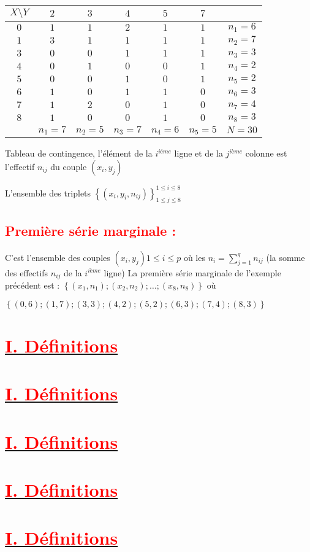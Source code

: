 \documentclass[12pt]{article}
\begin{document}
\begin{table}[h]
\begin{tabular}{|c|c|c|c|c|c|c|}
\hline
$X\setminus Y$  & $2$ & $3$ & $4$ & $5$ & $7$ &  \\
\hline
$0$ & $1$ & $1$ & $2$ & $1$ & $1$ & $n_{1}=6$ \\
\hline
$1$  & $3$ & $1$ & $1$ & $1$ & $1$ & $n_{2}=7$ \\
\hline
$3$ & $0$ & $0$ & $1$ & $1$ & $1$ & $n_{3}=3$ \\
\hline
$4$  & $0$ & $1$ & $0$ & $0$ & $1$ & $n_{4}=2$ \\
\hline
$5$ & $0$ & $0$ & $1$ & $0$ & $1$ & $n_{5}=2$ \\
\hline
$6$  & $1$ & $0$ & $1$ & $1$ & $0$ & $n_{6}=3$ \\
\hline
$7$ & $1$ & $2$ & $0$ & $1$ & $0$ & $n_{7}=4$ \\
\hline
$8$  & $1$ & $0$ & $0$ & $1$ & $0$ & $n_{8}=3$ \\
\hline
  & $n_{1}=7$ & $n_{2}=5$ & $n_{3}=7$ & $n_{4}=6$ & $n_{5}=5$ & $N=30$ \\
\hline
\end{tabular}
\end{table}

Tableau de contingence, l’élément de la $i^{iéme}$ ligne et de la $j^{ième}$ colonne est l’effectif $n_{ij}$ du couple $(x_{i},y_{j})$

L’ensemble des triplets 
$\left\lbrace (x_{i},y_{i},n_{ij}) \right\rbrace^{1\leq i \leq 8}_{1\leq j \leq8} $
\subsection*{\textbf{\textcolor{red}{Première série marginale :}}}
C’est l’ensemble des couples $(x_{i},y_{j}) 1\leq i\leq p$  où les $n_{i}=\sum_{j=1}^{q}n_{ij}$ (la somme des effectifs $n_{ij}$ de la $i^{ième}$ ligne)  La première série marginale de l’exemple précédent est : 
$\left\lbrace (x_{1}, n_{1}) ; (x_{2}, n_{2}) ; …  ; (x_{8}, n_{8})\right\rbrace $   où  

$\left\lbrace (0,6) ; (1,7) ; (3,3) ; (4,2) ; (5,2) ; (6,3) ; (7,4) ; (8,3)\right\rbrace $
\section*{\underline{\textbf{\textcolor{red}{I. Définitions}}}}
\section*{\underline{\textbf{\textcolor{red}{I. Définitions}}}}
\section*{\underline{\textbf{\textcolor{red}{I. Définitions}}}}
\section*{\underline{\textbf{\textcolor{red}{I. Définitions}}}}
\section*{\underline{\textbf{\textcolor{red}{I. Définitions}}}}
\end{document}

